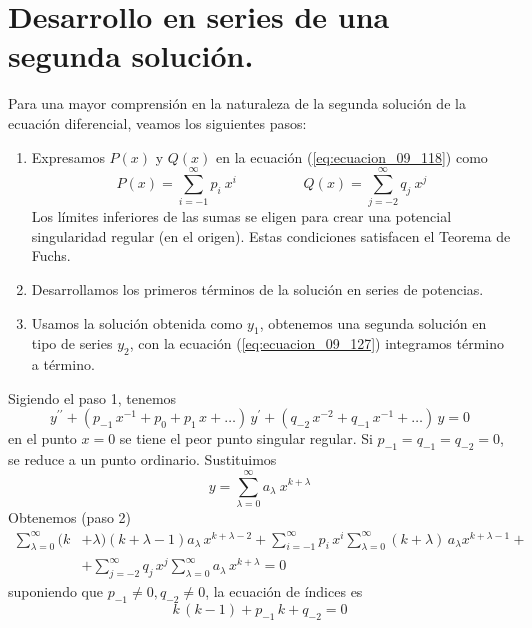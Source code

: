 \section{Desarrollo en series de una segunda solución.}
Para una mayor comprensión en la naturaleza de la segunda solución de la ecuación diferencial, veamos los siguientes pasos:
\begin{enumerate}
\item Expresamos $P(x)$ y $Q(x)$ en la ecuación (\ref{eq:ecuacion_09_118}) como
\begin{equation}
P(x) = \sum_{i=-1}^{\infty} p_{i} \: x^{i} \hspace{2cm} Q(x) = \sum_{j=-2}^{\infty} q_{j} \: x^{j}
\label{eq:ecuacion_09_129}
\end{equation}
Los límites inferiores de las sumas se eligen para crear una potencial singularidad regular (en el origen). Estas condiciones satisfacen el Teorema de Fuchs.
\item Desarrollamos los primeros términos de la solución en series de potencias.
\item Usamos la solución obtenida como $y_{1}$, obtenemos una segunda solución en tipo de series $y_{2}$, con la ecuación (\ref{eq:ecuacion_09_127}) integramos término a término.
\end{enumerate}
Sigiendo el paso 1, tenemos
\begin{equation}
y^{\prime \prime} + (p_{-1} \, x^{-1} + p_{0} + p_{1} \, x + \ldots) \, y^{\prime} + (q_{-2} \, x^{-2} + q_{-1} \, x^{-1} + \ldots) \, y = 0
\label{eq:ecuacion_09_130}
\end{equation}
en el punto $x = 0$ se tiene el peor punto singular regular. Si $p_{-1} = q_{-1} = q_{-2} = 0$, se reduce a un punto ordinario. Sustituimos
\[ y = \sum_{\lambda = 0}^{\infty} a_{\lambda} \: x^{k + \lambda} \]
Obtenemos (paso 2)
\begin{equation}
\begin{aligned}
\sum_{\lambda=0}^{\infty} (k &+ \lambda)(k + \lambda - 1) a_{\lambda} \, x^{k + \lambda - 2} + \sum_{i=-1}^{\infty} p_{i} \, x^{i} \sum_{\lambda=0}^{\infty} (k + \lambda) \,  a_{\lambda} x^{k + \lambda - 1} + \\
&+ \sum_{j=-2}^{\infty} q_{j} \, x^{j} \sum_{\lambda=0}^{\infty} a_{\lambda} \, x^{k + \lambda} = 0
\end{aligned}
\label{eq:ecuacion_09_131}
\end{equation}
suponiendo que $p_{-1} \neq 0, q_{-2} \neq 0$, la ecuación de índices es
\[ k \, (k - 1) + p_{-1} \, k + q_{-2} = 0 \]
